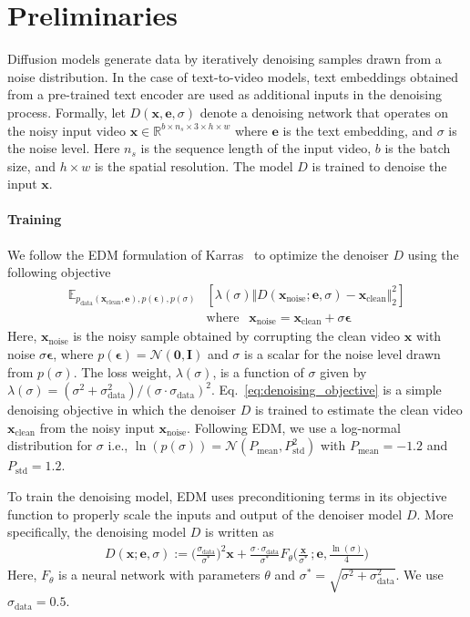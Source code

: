 \documentclass[10pt,twocolumn,letterpaper]{article}
\newcommand{\xx}{\mathbf{x}}
\newcommand{\ee}{\mathbf{e}}
\newcommand{\bzero}{\mathbf{0}}
\newcommand{\bI}{\mathbf{I}}
\newcommand{\cN}{\mathcal{N}}
\newcommand{\beps}{\mathbf{\epsilon}}
\begin{document}
 \section{Preliminaries}

Diffusion models generate data by iteratively denoising samples drawn from a noise distribution. In the case of text-to-video models, text embeddings obtained from a pre-trained text encoder are used as additional inputs in the denoising process. Formally, let $D(\xx, \ee, \sigma)$ denote a denoising network that operates on the noisy input video $\xx \in \mathbb{R}^{b\times n_{s} \times 3 \times h \times w}$ where $\ee$ is the text embedding, and $\sigma$ is the noise level. Here $n_{s}$ is the sequence length of the input video, $b$ is the batch size, and $h \times w$ is the spatial resolution. The model $D$ is trained to denoise the input $\xx$. 

\paragraph{Training}
We follow the EDM formulation of Karras~\etal\cite{karras2022elucidating} to optimize the denoiser $D$ using the following objective
\begin{align}\label{eq:denoising_objective}
    \mathbb{E}_{p_{\text{data}}(\xx_{\text{clean}}, \ee), p(\beps), p(\sigma)} & \left[\lambda(\sigma)\Vert D(\xx_{\text{noise}};\ee, \sigma) - \xx_{\text{clean}} \Vert^2_2 \right] \\
    & \text{where }~~ \xx_{\text{noise}} = \xx_{\text{clean}} + \sigma \beps \nonumber
\end{align}
Here, $\xx_{\text{noise}}$ is the noisy sample obtained by corrupting the clean video $\xx$ with noise $\sigma \beps$, where $p(\beps) = \cN(\bzero, \bI)$ and $\sigma$ is a scalar for the noise level drawn from $p(\sigma)$. The loss weight, $\lambda(\sigma)$, is a function of $\sigma$ given by $\lambda(\sigma) = (\sigma^2 + \sigma_{\text{data}}^2) / (\sigma \cdot \sigma_{\text{data}})^2$.
Eq.~\eqref{eq:denoising_objective} is a simple denoising objective in which the denoiser $D$ is trained to estimate the clean video $\xx_{\text{clean}}$ from the noisy input $\xx_{\text{noise}}$. Following EDM, we use a log-normal distribution for $\sigma$ i.e., $\ln(p(\sigma)) = \cN(P_{\text{mean}}, P_{\text{std}}^2)$ with $P_{\text{mean}} = -1.2$ and $P_{\text{std}}=1.2$.


To train the denoising model, EDM uses preconditioning terms in its objective function to properly scale the inputs and output of the denoiser model $D$. More specifically, the denoising model $D$ is written as 
\begin{align*}
    D(\xx; \ee, \!\sigma)\!:=\!\Big(\frac{\sigma_{\text{data}}}{\sigma^*}\Big)^2\xx + \frac{\sigma\cdot\sigma_{\text{data}}}{\sigma^*} F_\theta\Big(\frac{\xx}{\sigma^*}\,;\ee,\!\frac{\ln(\sigma)}{4}\Big)
\end{align*}
Here, $F_{\theta}$ is a neural network with parameters $\theta$ and $\sigma^* = \sqrt{\sigma^2 + \sigma_{\text{data}}^2}$. We use $\sigma_{\text{data}} = 0.5$.
\end{document}
